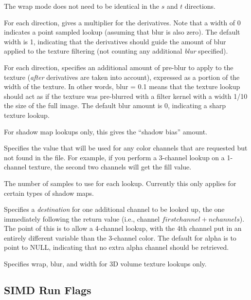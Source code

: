 The wrap mode does not need to be identical in the $s$ and $t$
directions.
\apiend

For each direction, gives a multiplier for the derivatives.  Note that
a width of 0 indicates a point sampled lookup (assuming that blur is
also zero).  The default width is 1, indicating that the derivatives
should guide the amount of blur applied to the texture filtering (not
counting any additional \emph{blur} specified).
\apiend

For each direction, specifies an additional amount of pre-blur to apply
to the texture (\emph{after} derivatives are taken into account),
expressed as a portion of the width of the texture.  In other words,
blur = 0.1 means that the texture lookup should act as if the texture
was pre-blurred with a filter kernel with a width 1/10 the size of the
full image.  The default blur amount is 0, indicating a sharp texture
lookup.
\apiend

For shadow map lookups only, this gives the ``shadow bias'' amount.
\apiend

Specifies the value that will be used for any color channels that are
requested but not found in the file.  For example, if you perform a
3-channel lookup on a 1-channel texture, the second two channels will
get the fill value.
\apiend

The number of samples to use for each lookup.  Currently this only
applies for certain types of shadow maps.
\apiend

Specifies a \emph{destination} for one additional channel to be looked
up, the one immediately following the return value (i.e., channel
$\mathit{firstchannel}+\mathit{nchannels}$).  The point of this is to
allow a 4-channel lookup, with the 4th channel put in an entirely
different variable than the 3-channel color.  The default for {\cf
  alpha} is to point to NULL, indicating that no extra alpha channel
should be retrieved.
\apiend

Specifies wrap, blur, and width for 3D volume texture lookups only.
\apiend

\subsection{SIMD Run Flags}

